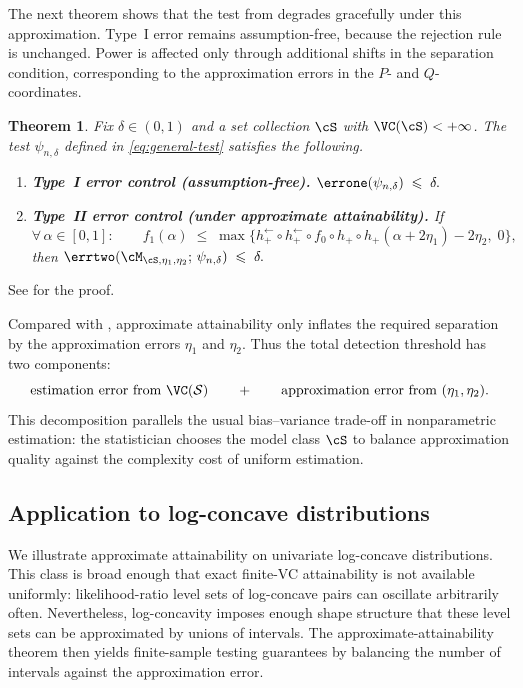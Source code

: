 \documentclass[english]{article}
\theoremstyle{plain}
\newtheorem{theorem}{Theorem}[section]
\theoremstyle{definition}
\newcommand{\hupup}{h_+\mathbin{\circ}h_+}                 %
\newcommand{\hinvinv}{h_+^{\leftarrow}\mathbin{\circ}h_+^{\leftarrow}}  %
\newcommand{\fnull}{f_0}
\newcommand{\falt}{f_1}
\begin{document}
The next theorem shows that the test from  degrades
gracefully under this approximation. Type~I error remains assumption-free,
because the rejection rule is unchanged. Power is affected only through
additional shifts in the separation condition, corresponding to the
approximation errors in the \(P\)- and \(Q\)-coordinates.
\begin{theorem}\label{thm:misspecified}
Fix $\delta \in (0,1)$ and a set collection $\cS$ with
$\VC(\cS) < +\infty$. The test $\psi_{n,\delta}$ defined in
\eqref{eq:general-test} satisfies the following.

\begin{enumerate}[label=(\roman*)]
\item \textbf{Type~I error control (assumption-free).}
$\errone(\psi_{n,\delta}) \;\leqslant\; \delta.
$

\item \textbf{Type~II error control (under approximate attainability).}
If
\begin{equation}\label{eq:gap-misspecified}
\forall\, \alpha \in [0,1]:\qquad
\falt(\alpha)
\;\leqslant\;
\max\big\{\hinvinv\circ\fnull\circ \hupup(\alpha + 2\eta_1)-2\eta_2,\;0\big\},
\end{equation}
then 
$\errtwo(\cM_{\cS,\eta_1,\eta_2};\, \psi_{n,\delta}) \;\leqslant\; \delta.
$
\end{enumerate}
\end{theorem}

\noindent See  for the proof.
\medskip


Compared with , approximate attainability only
inflates the required separation by the approximation errors \(\eta_1\) and
\(\eta_2\). Thus the total detection threshold has two components:
\[
\text{estimation error from }\VC(\mathcal S)
\qquad+\qquad
\text{approximation error from }(\eta_1,\eta_2).
\]
This
decomposition parallels the usual bias--variance trade-off in nonparametric
estimation: the statistician chooses the model class \(\cS\) to balance
approximation quality against the complexity cost of uniform estimation.


\subsection{Application to log-concave distributions}

We illustrate approximate attainability on univariate log-concave
distributions. This class is broad enough that exact finite-VC attainability is
not available uniformly: likelihood-ratio level sets of log-concave pairs can
oscillate arbitrarily often. Nevertheless, log-concavity imposes enough shape
structure that these level sets can be approximated by unions of intervals.
The approximate-attainability theorem then yields finite-sample testing
guarantees by balancing the number of intervals against the approximation
error.
\end{document}
